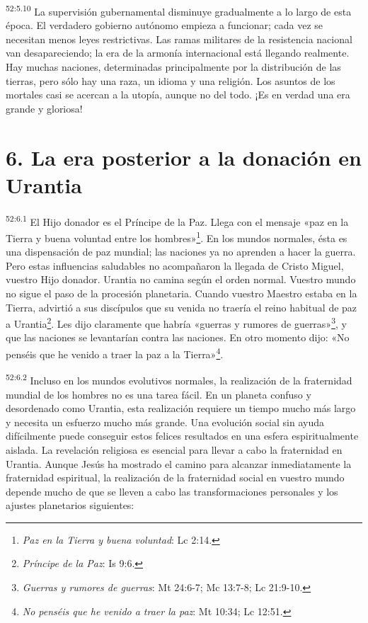 \par
\textsuperscript{52:5.10} La supervisión gubernamental disminuye gradualmente a lo largo de esta época. El verdadero gobierno autónomo empieza a funcionar; cada vez se necesitan menos leyes restrictivas. Las ramas militares de la resistencia nacional van desapareciendo; la era de la armonía internacional está llegando realmente. Hay muchas naciones, determinadas principalmente por la distribución de las tierras, pero sólo hay una raza, un idioma y una religión. Los asuntos de los mortales casi se acercan a la utopía, aunque no del todo. ¡Es en verdad una era grande y gloriosa!

\section*{6. La era posterior a la donación en Urantia}
\par
\textsuperscript{52:6.1} El Hijo donador es el Príncipe de la Paz. Llega con el mensaje «paz en la Tierra y buena voluntad entre los hombres»\footnote{\textit{Paz en la Tierra y buena voluntad}: Lc 2:14.}. En los mundos normales, ésta es una dispensación de paz mundial; las naciones ya no aprenden a hacer la guerra. Pero estas influencias saludables no acompañaron la llegada de Cristo Miguel, vuestro Hijo donador. Urantia no camina según el orden normal. Vuestro mundo no sigue el paso de la procesión planetaria. Cuando vuestro Maestro estaba en la Tierra, advirtió a sus discípulos que su venida no traería el reino habitual de paz a Urantia\footnote{\textit{Príncipe de la Paz}: Is 9:6.}. Les dijo claramente que habría «guerras y rumores de guerras»\footnote{\textit{Guerras y rumores de guerras}: Mt 24:6-7; Mc 13:7-8; Lc 21:9-10.}, y que las naciones se levantarían contra las naciones. En otro momento dijo: «No penséis que he venido a traer la paz a la Tierra»\footnote{\textit{No penséis que he venido a traer la paz}: Mt 10:34; Lc 12:51.}.

\par
\textsuperscript{52:6.2} Incluso en los mundos evolutivos normales, la realización de la fraternidad mundial de los hombres no es una tarea fácil. En un planeta confuso y desordenado como Urantia, esta realización requiere un tiempo mucho más largo y necesita un esfuerzo mucho más grande. Una evolución social sin ayuda difícilmente puede conseguir estos felices resultados en una esfera espiritualmente aislada. La revelación religiosa es esencial para llevar a cabo la fraternidad en Urantia. Aunque Jesús ha mostrado el camino para alcanzar inmediatamente la fraternidad espiritual, la realización de la fraternidad social en vuestro mundo depende mucho de que se lleven a cabo las transformaciones personales y los ajustes planetarios siguientes:


